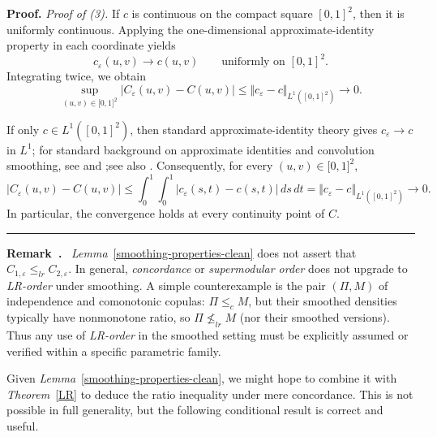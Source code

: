 \documentclass[onecolumn]{article}
\newenvironment{remark}{  \refstepcounter{theorem}  \par\medskip\noindent\textbf{Remark~\thetheorem.}\rmfamily\ }{\par\medskip}
\newenvironment{proof}[1][Proof]{\noindent\textbf{#1.} }{\ \rule{0.5em}{0.5em}}
\begin{document}
\begin{proof}
\medskip \noindent \emph{Proof of (3).} If $c$ is continuous on the compact
square $[0,1]^{2}$, then it is uniformly continuous. Applying the
one-dimensional approximate-identity property in each coordinate yields 
\begin{equation}
c_{\varepsilon }(u,v)\rightarrow c(u,v)\qquad \text{uniformly on }[0,1]^{2}.
\label{822.12}
\end{equation}%
Integrating twice, we obtain 
\begin{equation}
\sup_{(u,v)\in \lbrack 0,1]^{2}}|C_{\varepsilon }(u,v)-C(u,v)|\leq \Vert
c_{\varepsilon }-c\Vert _{L^{1}([0,1]^{2})}\longrightarrow 0.  \label{822.13}
\end{equation}

If only $c\in L^{1}([0,1]^{2})$, then standard approximate-identity theory
gives $c_{\varepsilon }\rightarrow c$ in $L^{1}$; for standard background on
approximate identities and convolution smoothing, see \cite[Chapter 2]{[73]}
and \cite[Chapter 2]{[74]};see also \cite[Section~1.5]{[72]}. Consequently,
for every $(u,v)\in \lbrack 0,1]^{2}$, 
\begin{equation}
|C_{\varepsilon }(u,v)-C(u,v)|\leq \int_{0}^{1}\int_{0}^{1}|c_{\varepsilon
}(s,t)-c(s,t)|\,ds\,dt=\Vert c_{\varepsilon }-c\Vert
_{L^{1}([0,1]^{2})}\rightarrow 0.  \label{822.14}
\end{equation}%
In particular, the convergence holds at every continuity point of $C$.
\end{proof}

\begin{remark}
\textit{Lemma}~\ref{smoothing-properties-clean} does not assert that $%
C_{1,\varepsilon }\leq _{lr}C_{2,\varepsilon }$. In general, \textit{%
concordance} or \textit{supermodular order} does not upgrade to \textit{%
LR-order} under smoothing. A simple counterexample is the pair $(\Pi ,M)$ of
independence and comonotonic copulas: $\Pi \leq _{c}M$, but their smoothed
densities typically have nonmonotone ratio, so $\Pi \not\leq _{lr}M$ (nor
their smoothed versions). Thus any use of \textit{LR-order} in the smoothed
setting must be explicitly assumed or verified within a specific parametric
family.
\end{remark}

Given \textit{Lemma}~\ref{smoothing-properties-clean}, we might hope to
combine it with \textit{Theorem}~\ref{LR} to deduce the ratio inequality
under mere concordance. This is not possible in full generality, but the
following conditional result is correct and useful.
\end{document}
